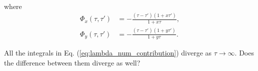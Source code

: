 \documentclass[11pt]{article}
\begin{document}
\begin{align}
\end{align}
where 
\begin{subequations}\begin{align}
    \Phi_x(\tau, \tau') &= -\frac{(\tau-\tau')(1+x\tau')}{1+x\tau}, \\
    \Phi_y(\tau,\tau') &= -\frac{(\tau-\tau')(1+y\tau')}{1+y\tau}.
\end{align}\end{subequations}

All the integrals in Eq. (\ref{eq:lambda_num_contribution}) diverge as $\tau \rightarrow \infty$. Does the difference between them diverge as well?
\end{document}
